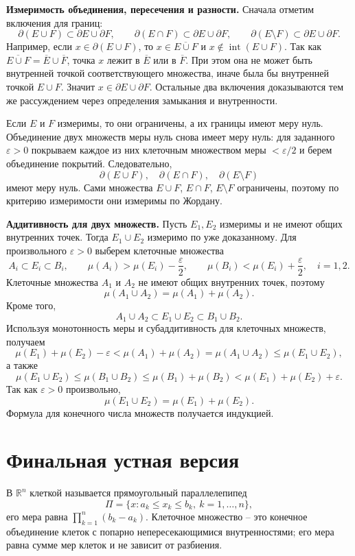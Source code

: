 \documentclass[12pt,a4paper]{article}
\newcommand{\R}{\mathbb{R}}
\newcommand{\eps}{\varepsilon}
\newcommand{\Int}{\operatorname{int}}
\newcommand{\Fr}{\partial}
\begin{document}
\textbf{Измеримость объединения, пересечения и разности.}
Сначала отметим включения для границ:
\[
  \Fr(E\cup F)\subset \Fr E\cup\Fr F,
  \qquad
  \Fr(E\cap F)\subset \Fr E\cup\Fr F,
  \qquad
  \Fr(E\setminus F)\subset \Fr E\cup\Fr F.
\]
Например, если \(x\in\Fr(E\cup F)\), то \(x\in\overline{E\cup F}\) и
\(x\notin\Int(E\cup F)\). Так как
\(\overline{E\cup F}=\overline E\cup\overline F\), точка \(x\) лежит в
\(\overline E\) или в \(\overline F\). При этом она не может быть внутренней
точкой соответствующего множества, иначе была бы внутренней точкой
\(E\cup F\). Значит \(x\in\Fr E\cup\Fr F\). Остальные два включения
доказываются тем же рассуждением через определения замыкания и внутренности.

Если \(E\) и \(F\) измеримы, то они ограничены, а их границы имеют меру нуль.
Объединение двух множеств меры нуль снова имеет меру нуль: для заданного
\(\eps>0\) покрываем каждое из них клеточным множеством меры \(<\eps/2\) и
берем объединение покрытий. Следовательно,
\[
  \Fr(E\cup F),\quad \Fr(E\cap F),\quad \Fr(E\setminus F)
\]
имеют меру нуль. Сами множества \(E\cup F\), \(E\cap F\), \(E\setminus F\)
ограничены, поэтому по критерию измеримости они измеримы по Жордану.

\textbf{Аддитивность для двух множеств.}
Пусть \(E_1,E_2\) измеримы и не имеют общих внутренних точек. Тогда
\(E_1\cup E_2\) измеримо по уже доказанному. Для произвольного \(\eps>0\)
выберем клеточные множества
\[
  A_i\subset E_i\subset B_i,\qquad
  \mu(A_i)>\mu(E_i)-\frac{\eps}{2},\qquad
  \mu(B_i)<\mu(E_i)+\frac{\eps}{2},
  \quad i=1,2.
\]
Клеточные множества \(A_1\) и \(A_2\) не имеют общих внутренних точек, поэтому
\[
  \mu(A_1\cup A_2)=\mu(A_1)+\mu(A_2).
\]
Кроме того,
\[
  A_1\cup A_2\subset E_1\cup E_2\subset B_1\cup B_2.
\]
Используя монотонность меры и субаддитивность для клеточных множеств, получаем
\[
  \mu(E_1)+\mu(E_2)-\eps
  <
  \mu(A_1)+\mu(A_2)
  =
  \mu(A_1\cup A_2)
  \le
  \mu(E_1\cup E_2),
\]
а также
\[
  \mu(E_1\cup E_2)
  \le
  \mu(B_1\cup B_2)
  \le
  \mu(B_1)+\mu(B_2)
  <
  \mu(E_1)+\mu(E_2)+\eps.
\]
Так как \(\eps>0\) произвольно,
\[
  \mu(E_1\cup E_2)=\mu(E_1)+\mu(E_2).
\]
Формула для конечного числа множеств получается индукцией.

\section*{Финальная устная версия}

В \(\R^n\) клеткой называется прямоугольный параллелепипед
\[
  \Pi=\{x: a_k\le x_k\le b_k,\ k=1,\dots,n\},
\]
его мера равна \(\prod_{k=1}^n(b_k-a_k)\). Клеточное множество -- это конечное
объединение клеток с попарно непересекающимися внутренностями; его мера равна
сумме мер клеток и не зависит от разбиения.
\end{document}
